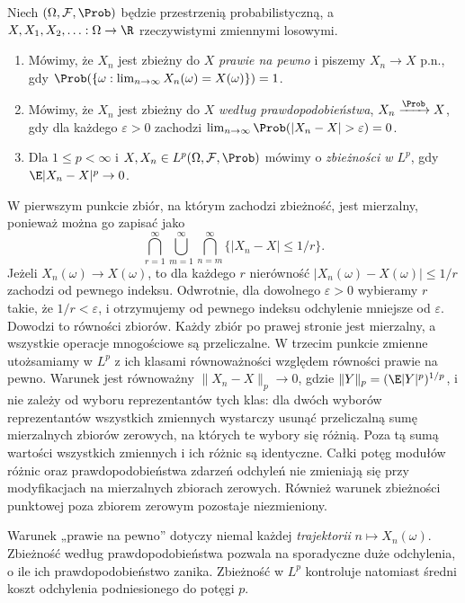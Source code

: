 \begin{definicja}
Niech $(\Omega,\mathcal F,\Prob)$ będzie przestrzenią
probabilistyczną, a $X,X_1,X_2,\ldots:\Omega\to\R$
rzeczywistymi zmiennymi losowymi.
\begin{enumerate}
\item Mówimy, że $X_n$ jest zbieżny do $X$ \emph{prawie na pewno}
 i piszemy $X_n\to X$ p.n., gdy
 $\Prob(\{\omega:\lim_{n\to\infty}X_n(\omega)=X(\omega)\})=1$.
\item Mówimy, że $X_n$ jest zbieżny do $X$
 \emph{według prawdopodobieństwa}, $X_n\xrightarrow{\Prob}X$,
 gdy dla każdego $\varepsilon>0$ zachodzi
 $\lim_{n\to\infty}\Prob(|X_n-X|>\varepsilon)=0$.
\item Dla $1\leq p<\infty$ i $X,X_n\in L^p(\Omega,\mathcal F,\Prob)$
 mówimy o \emph{zbieżności w $L^p$}, gdy
 $\E|X_n-X|^p\to0$.
\end{enumerate}
W pierwszym punkcie zbiór, na którym zachodzi zbieżność,
jest mierzalny, ponieważ można go zapisać jako
\[
\bigcap_{r=1}^\infty\bigcup_{m=1}^\infty
\bigcap_{n=m}^\infty\{|X_n-X|\leq1/r\}.
\]
Jeżeli $X_n(\omega)\to X(\omega)$, to dla każdego $r$
nierówność $|X_n(\omega)-X(\omega)|\leq1/r$ zachodzi
od pewnego indeksu. Odwrotnie, dla dowolnego
$\varepsilon>0$ wybieramy $r$ takie, że $1/r<\varepsilon$,
i otrzymujemy od pewnego indeksu odchylenie mniejsze
od $\varepsilon$. Dowodzi to równości zbiorów.
Każdy zbiór po prawej stronie jest mierzalny,
a wszystkie operacje mnogościowe są przeliczalne.
W trzecim punkcie zmienne utożsamiamy w $L^p$ z ich
klasami równoważności względem równości prawie na pewno.
Warunek jest równoważny $\|X_n-X\|_p\to0$, gdzie
$\|Y\|_p=(\E|Y|^p)^{1/p}$, i nie zależy od wyboru
reprezentantów tych klas: dla dwóch wyborów
reprezentantów wszystkich zmiennych wystarczy usunąć
przeliczalną sumę mierzalnych zbiorów zerowych,
na których te wybory się różnią. Poza tą sumą
wartości wszystkich zmiennych i ich różnic są identyczne.
Całki potęg modułów różnic oraz prawdopodobieństwa
zdarzeń odchyleń nie zmieniają się przy modyfikacjach
na mierzalnych zbiorach zerowych. Również warunek
zbieżności punktowej poza zbiorem zerowym pozostaje
niezmieniony.
\end{definicja}

Warunek „prawie na pewno” dotyczy niemal każdej
\emph{trajektorii} $n\mapsto X_n(\omega)$.
Zbieżność według prawdopodobieństwa pozwala na sporadyczne
duże odchylenia, o ile ich prawdopodobieństwo zanika.
Zbieżność w $L^p$ kontroluje natomiast średni koszt
odchylenia podniesionego do potęgi $p$.


